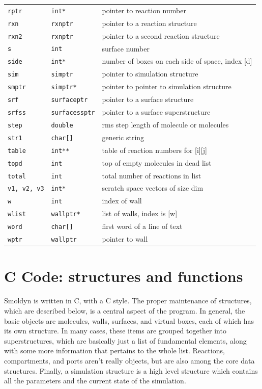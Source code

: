 \documentclass {scrbook}
\newcommand {\ttt} {\texttt}
\begin{document}
\begin{longtable}[c]{lll}
\ttt{rptr} & \ttt{int*} & pointer to reaction number\\
\ttt{rxn} & \ttt{rxnptr} & pointer to a reaction structure\\
\ttt{rxn2} & \ttt{rxnptr} & pointer to a second reaction structure\\
\ttt{s} & \ttt{int} & surface number\\
\ttt{side} & \ttt{int*} & number of boxes on each side of space, index [d]\\
\ttt{sim} & \ttt{simptr} & pointer to simulation structure\\
\ttt{smptr} & \ttt{simptr*} & pointer to pointer to simulation structure\\
\ttt{srf} & \ttt{surfaceptr} & pointer to a surface structure\\
\ttt{srfss} & \ttt{surfacessptr} & pointer to a surface superstructure\\
\ttt{step} & \ttt{double} & rms step length of molecule or molecules\\
\ttt{str1} & \ttt{char[]} & generic string\\
\ttt{table} & \ttt{int**} & table of reaction numbers for [i][j]\\
\ttt{topd} & \ttt{int} & top of empty molecules in dead list\\
\ttt{total} & \ttt{int} & total number of reactions in list\\
\ttt{v1, v2, v3} & \ttt{int*} & scratch space vectors of size dim\\
\ttt{w} & \ttt{int} & index of wall\\
\ttt{wlist} & \ttt{wallptr*} & list of walls, index is [w]\\
\ttt{word} & \ttt{char[]} & first word of a line of text\\
\ttt{wptr} & \ttt{wallptr} & pointer to wall\\
\end{longtable}

\chapter{C Code: structures and functions}

Smoldyn is written in C, with a C style. The proper maintenance of structures, which are described below, is a central aspect of the program. In general, the basic objects are molecules, walls, surfaces, and virtual boxes, each of which has its own structure. In many cases, these items are grouped together into superstructures, which are basically just a list of fundamental elements, along with some more information that pertains to the whole list. Reactions, compartments, and ports aren't really objects, but are also among the core data structures. Finally, a simulation structure is a high level structure which contains all the parameters and the current state of the simulation.
\end{document}
